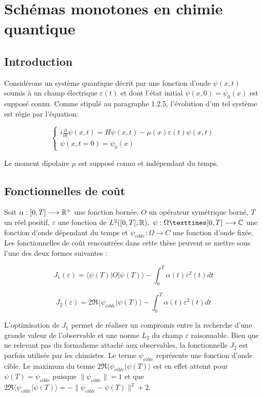 \chapter{Schémas monotones en chimie quantique}

\section{Introduction}

Considérons un système quantique décrit par une fonction d’onde $\psi(x, t)$ soumis à un champ électrique $\varepsilon(t)$ et dont l’état initial $\psi(x, 0) = \psi_0 (x)$ est supposé connu. Comme stipulé au paragraphe 1.2.5, l’évolution d’un tel système est régie par l’équation:

\begin{equation}
\begin{cases}
i \frac{\partial}{\partial t} \psi (x,t) = H\psi(x,t) - \mu(x)\varepsilon(t)\psi(x,t)\\
\psi(x,t=0)=\psi_0(x)
\end{cases}
\end{equation}

Le moment dipolaire $\mu$ est supposé connu et indépendant du temps.

\section{Fonctionnelles de coût}
Soit $\alpha : [0, T ] \longrightarrow \mathbb R^+$ une fonction bornée, $O$ un opérateur symétrique borné, $T$ un réel positif, $\varepsilon$ une fonction de $L^2 ([0, T ], \R),\  \psi : \Omega × [0, T ] \longrightarrow \C$ une fonction d’onde dépendant du temps et $\psi_{cible} : \Omega \longrightarrow C$ une fonction d’onde fixée.
\\Les fonctionnelles de coût rencontrées dans cette thèse peuvent se mettre sous l’une des deux formes suivantes :

\begin{equation}
J_1(\varepsilon) = \langle \psi(T)|O|\psi(T) \rangle - \int_0^T \alpha(t)\varepsilon^2(t)dt
\end{equation}

\begin{equation}
J_2(\varepsilon) = 2\Re\langle \psi_{cible}|\psi(T)\rangle - \int_0^T \alpha(t)\varepsilon^2(t)dt
\end{equation}

L’optimisation de $J_1$ permet de réaliser un compromis entre la recherche d'une grande valeur de l’observable et une norme $L_2$ du champ $\varepsilon$ raisonnable. Bien que ne relevant pas du formalisme attaché aux observables, la fonctionnelle $J_2$ est parfois utilisée par les chimistes. Le terme $\psi_{cible}$ représente une fonction d’onde cible. Le maximum du terme $2\Re\langle \psi_{cible}|\psi(T)\rangle$ est en effet atteint pour $\psi(T) = \psi_{cible}$ puisque $\lVert \psi_{cible} \rVert = 1$ et que $2\Re\langle \psi_{cible}|\psi(T)\rangle = -\lVert \psi_{cible} - \psi(T)\rVert ^2+2$.

